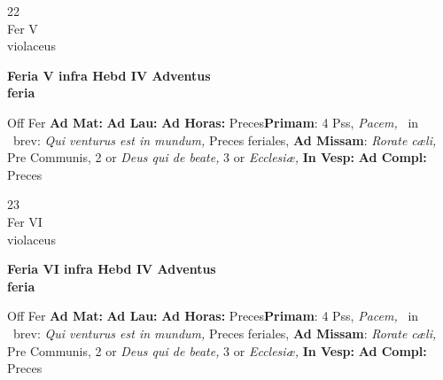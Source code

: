 \documentclass[10pt, openany]{book}
\begin{document}
        \begin{center}
            \begin{minipage}{3.5in}
                \vspace{2em}
                \begin{minipage}{0.5in}
                    {\Huge 22} \\
                    {\normalsize Fer V} \\
                    {\normalsize violaceus}
                \end{minipage}
                \begin{minipage}{3.0in}
                    \textbf{ \large Feria V infra Hebd IV Adventus \\
                    \textnormal{\normalsize feria}} \\ 
                \end{minipage}
                \begin{justify}Off Fer
                    \textbf{Ad Mat: }
                    \textbf{Ad Lau: }
                    \textbf{Ad Horas: }Preces\textbf{Primam}: 4 Pss, \textit{Pacem,} \Vbar\ in \Rbar\ brev: \textit{Qui venturus est in mundum,} Preces feriales, \textbf{Ad Missam}: \textit{Rorate cæli,} Pre Communis, 2 or \textit{Deus qui de beate,} 3 or \textit{Ecclesiæ,}  
                    \textbf{In Vesp: }
                    \textbf{Ad Compl: }Preces
                \end{justify}
            \end{minipage}
        \end{center}
    
        \begin{center}
            \begin{minipage}{3.5in}
                \vspace{2em}
                \begin{minipage}{0.5in}
                    {\Huge 23} \\
                    {\normalsize Fer VI} \\
                    {\normalsize violaceus}
                \end{minipage}
                \begin{minipage}{3.0in}
                    \textbf{ \large Feria VI infra Hebd IV Adventus \\
                    \textnormal{\normalsize feria}} \\ 
                \end{minipage}
                \begin{justify}Off Fer
                    \textbf{Ad Mat: }
                    \textbf{Ad Lau: }
                    \textbf{Ad Horas: }Preces\textbf{Primam}: 4 Pss, \textit{Pacem,} \Vbar\ in \Rbar\ brev: \textit{Qui venturus est in mundum,} Preces feriales, \textbf{Ad Missam}: \textit{Rorate cæli,} Pre Communis, 2 or \textit{Deus qui de beate,} 3 or \textit{Ecclesiæ,}  
                    \textbf{In Vesp: }
                    \textbf{Ad Compl: }Preces
                \end{justify}
            \end{minipage}
        \end{center}
    
\end{document}
